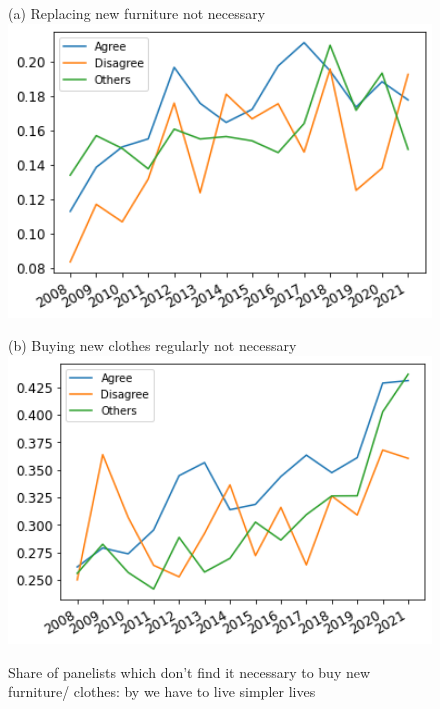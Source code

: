 \documentclass[12pt]{article}
\begin{document}
\begin{figure}[h!!]
	\centering	
	\caption{Share of panelists which don't find it necessary to buy new furniture/ clothes: by we have to live simpler lives}\label{fig:evolution_notNecessary_bygroup:Simpler}	
	\begin{minipage}[h!!]{0.32\textwidth}  
		\centering\footnotesize{(a) Replacing new furniture not necessary}
		\includegraphics[width=1\textwidth]{../codding_data/results/liss/broad_groups_notnecessaryqk20a181_ci307.png}
	\end{minipage}
	\begin{minipage}[h!!]{0.32\textwidth}
		\centering\footnotesize{(b) Buying new clothes regularly not necessary}
		\includegraphics[width=1\textwidth]{../codding_data/results/liss/broad_groups_notnecessaryqk20a181_ci306.png}
	\end{minipage}
\end{figure}
\end{document}
